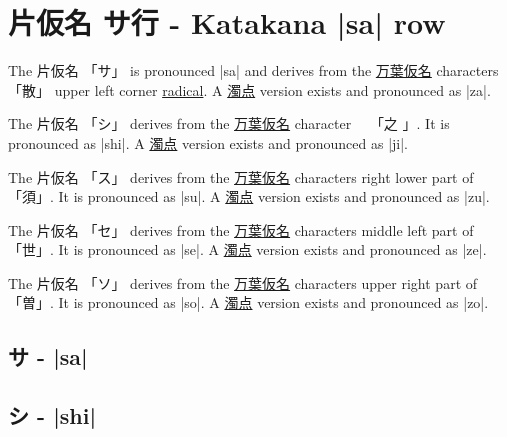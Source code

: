 \section{片仮名  サ行 - Katakana |sa| row}


 The  片仮名 {「サ」} is pronounced  |sa| and  derives from the
\hyperref[sec:Manyogana]{万葉仮名} characters {「散」} upper left corner
\hyperref[sec:Radical]{radical}.  A \hyperref[sec:Dakuten]{濁点} version exists
and pronounced as |za|.

 The 片仮名 {「シ」} derives from the
\hyperref[sec:Manyogana]{万葉仮名} character　 {「之 」}.  It is pronounced as
|shi|.  A \hyperref[sec:Dakuten]{濁点} version exists and pronounced as |ji|.


 The 片仮名 {「ス」} derives from the
\hyperref[sec:Manyogana]{万葉仮名} characters right lower part of {「須」}.  It
is pronounced as |su|.  A \hyperref[sec:Dakuten]{濁点} version exists and
pronounced as |zu|. 

 The 片仮名 {「セ」} derives from the
\hyperref[sec:Manyogana]{万葉仮名} characters middle left part of {「世」}.
It is pronounced as |se|.  A \hyperref[sec:Dakuten]{濁点} version exists and
pronounced as |ze|.  

\newpage

 The 片仮名 {「ソ」} derives from the
\hyperref[sec:Manyogana]{万葉仮名} characters upper right part of {「曽」}.  It is
pronounced as |so|.  A \hyperref[sec:Dakuten]{濁点} version exists and
pronounced as |zo|.




\newpage

\subsection{サ - |sa|} \label{sec:KatakanaSa}


\subsection{シ - |shi|} \label{sec:KatakanaShi}

